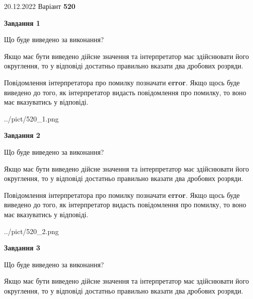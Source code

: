 \documentclass[12pt, ukrainian]{article}
\begin{document}
{20.12.2022 Варіант \No \textbf { 520 }\par}
{
\begin {Large}

{\begin {center}\textbf{Завдання 1}\end {center}}\par
Що буде виведено за виконання? \par

Якщо має бути виведено дійсне значення та інтерпретатор має здійснювати його округлення, 
то у відповіді достатньо правильно вказати два дробових розряди.

Повідомлення інтерпретатора про помилку позначати \textbf{error}.
Якщо щось буде виведено до того, як інтерпретатор видасть повідомлення про помилку, 
то воно має вказуватись у відповіді. \par

\begin{center}
	{../pict/520_1.png}
\end{center}
\newpage

{\begin {center}\textbf{Завдання 2}\end {center}}\par
Що буде виведено за виконання? \par

Якщо має бути виведено дійсне значення та інтерпретатор має здійснювати його округлення, 
то у відповіді достатньо правильно вказати два дробових розряди.

Повідомлення інтерпретатора про помилку позначати \textbf{error}.
Якщо щось буде виведено до того, як інтерпретатор видасть повідомлення про помилку, 
то воно має вказуватись у відповіді. \par

\begin{center}
	{../pict/520_2.png}
\end{center}
\newpage

{\begin {center}\textbf{Завдання 3}\end {center}}\par
Що буде виведено за виконання? \par

Якщо має бути виведено дійсне значення та інтерпретатор має здійснювати його округлення, 
то у відповіді достатньо правильно вказати два дробових розряди.


\end{Large}}
\end{document}
